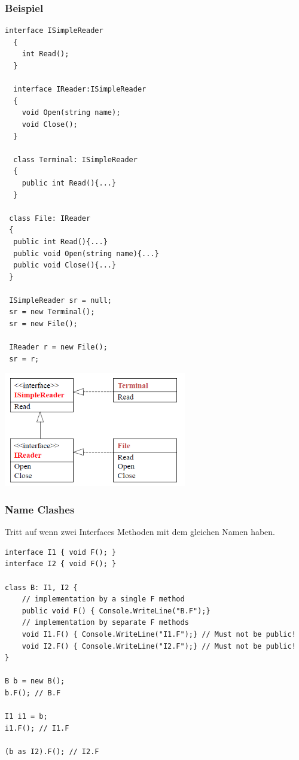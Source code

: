 \begin{multicols}{2}
\subsubsection{Beispiel}
\begin{lstlisting}[style=Csharp]
  interface ISimpleReader
  {
    int Read();  
  }
  
  interface IReader:ISimpleReader
  {
    void Open(string name); 
    void Close(); 
  }
  
  class Terminal: ISimpleReader
  {
    public int Read(){...}
  }
 
 class File: IReader
 {
  public int Read(){...}
  public void Open(string name){...}
  public void Close(){...}
 }
 
 ISimpleReader sr = null; 
 sr = new Terminal(); 
 sr = new File(); 
 
 IReader r = new File(); 
 sr = r; 
\end{lstlisting}

\columnbreak

  \includegraphics[height=5cm]{images/CSharp/InterfaceExample}

\end{multicols}

\subsubsection{Name Clashes}
Tritt auf wenn zwei Interfaces Methoden mit dem gleichen Namen haben.
\begin{lstlisting}
interface I1 { void F(); }
interface I2 { void F(); }

class B: I1, I2 {
	// implementation by a single F method
	public void F() { Console.WriteLine("B.F");}
	// implementation by separate F methods
	void I1.F() { Console.WriteLine("I1.F");} // Must not be public!
	void I2.F() { Console.WriteLine("I2.F");} // Must not be public!
}

B b = new B();
b.F(); // B.F

I1 i1 = b;
i1.F(); // I1.F

(b as I2).F(); // I2.F
\end{lstlisting} 